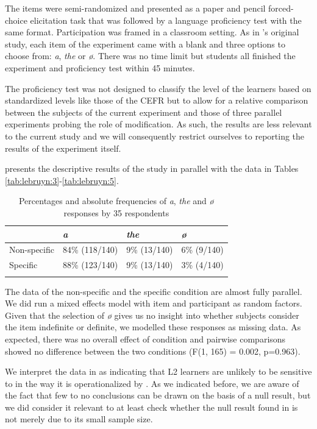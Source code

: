 \documentclass[output=paper,
modfonts
]{langscibook}
\begin{document}
The items were semi-randomized and presented as a paper and pencil forced-choice elicitation task that was followed by a language proficiency test with the same format. Participation was framed in a classroom setting. As in \citeauthor{IoninKoWexler2004}’s original study, each item of the experiment came with a blank and three options to choose from: \textit{a}, \textit{the} or \textit{ø}. There was no time limit but students all finished the experiment and proficiency test within 45 minutes. 

The proficiency test was not designed to classify the level of the learners based on standardized levels like those of the CEFR but to allow for a relative comparison between the subjects of the current experiment and those of three parallel experiments probing the role of modification. As such, the results are less relevant to the current study and we will consequently restrict ourselves to reporting the results of the experiment itself.

 presents the descriptive results of the study in parallel with the data in Tables \ref{tab:lebruyn:3}-\ref{tab:lebruyn:5}.

\begin{table}[h]
\begin{tabularx}{\textwidth}{XXXX}
\lsptoprule
 & \textit{a} & \textit{the} &  \textit{ø} \\
\midrule
Non-specific & 84\% (118/140) & 9\% (13/140) & 6\% (9/140)  \\
Specific & 88\% (123/140) & 9\% (13/140) & 3\% (4/140) \\
\lspbottomrule
\end{tabularx}
\caption{Percentages and absolute frequencies of \textit{a}, \textit{the} and \textit{ø} responses by 35  respondents}
\label{tab:lebruyn:6}
\end{table}

The data of the non-specific and the specific condition are almost fully parallel. We did run a mixed effects model with item and participant as random factors. Given that the selection of \textit{ø} gives us no insight into whether subjects consider the item indefinite or definite, we modelled these responses as missing data. As expected, there was no overall effect of condition and pairwise comparisons showed no difference between the two conditions (F(1, 165) = 0.002, p=0.963).

We interpret the data in  as indicating that  L2 learners are unlikely to be sensitive to  in the way it is operationalized by \citet{IoninKoWexler2004}. As we indicated before, we are aware of the fact that few to no conclusions can be drawn on the basis of a null result, but we did consider it relevant to at least check whether the null result found in \citet{Ting2005} is not merely due to its small sample size.
\end{document}
